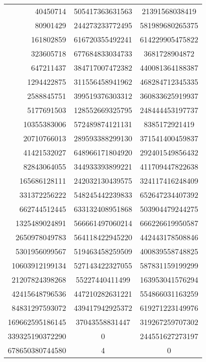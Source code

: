 \begin{enumerate}
\begin{center}
\begin{tabular}{ | r | c | c |}
				40450714        & 505417363631563 & 21391568038419 \\
				80901429        & 244273233772495 & 581989680265375 \\
				161802859       & 616720355492241 & 614229905475822 \\
				323605718       & 677684833034733 & 3681728904872 \\
				647211437       & 384717007472382 & 440081364188387 \\
				1294422875      & 311556458941962 & 468284712345335 \\
				2588845751      & 399519376303312 & 360833625919937 \\
				5177691503      & 128552669325795 & 248444453197737 \\
				10355383006     & 572489874121131 & 8385172921419 \\
				20710766013     & 289593388299130 & 371541400459837 \\
				41421532027     & 648966171804920 & 292401549856432 \\
				82843064055     & 344933393899221 & 411709447822638 \\
				165686128111    & 242032130439575 & 324117416248409 \\
				331372256222    & 548245442239833 & 652647234407392 \\
				662744512445    & 633132408951868 & 503904479244275 \\
				1325489024891   & 566661497060214 & 666226619950587 \\
				2650978049783   & 564118422945220 & 442443178508846 \\
				5301956099567   & 519463458259509 & 400839558748825 \\
				10603912199134  & 527143422327055 & 587831159199299 \\
				21207824398268  & 55227440411499  & 163953041576294 \\
				42415648796536  & 447210282631221 & 554866031163259 \\
				84831297593072  & 439417942925372 & 619271223149976 \\
				169662595186145 & 37043558831447  & 319267259707302 \\
				339325190372290 & 0               & 244551627273197 \\
				678650380744580 & 4               & 0 \\
				\hline
			\end{tabular}
		\end{center}
	\end{enumerate}
